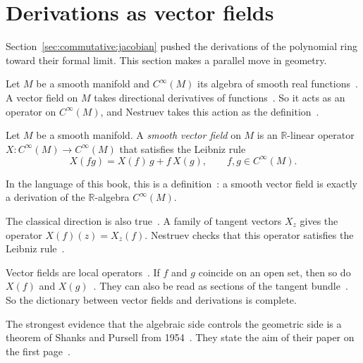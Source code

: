 \section{Derivations as vector fields}\label{sec:commutative:vector-fields-geometry}

Section~\ref{sec:commutative:jacobian} pushed the derivations of the
polynomial ring toward their formal limit. This section makes a parallel move
in geometry.

Let $M$ be a smooth manifold and $C^\infty(M)$ its algebra of smooth real
functions~\cite[p.~122]{Nestruev2020}. A vector field on $M$ takes directional derivatives of
functions~\cite[p.~122]{Nestruev2020}. So it acts as an operator on
$C^\infty(M)$, and Nestruev takes this action as the
definition~\cite[p.~122]{Nestruev2020}.

\begin{definition}\label{def:comm:vf}
Let $M$ be a smooth manifold. A \emph{smooth vector field} on $M$ is an
$\mathbb{R}$-linear operator $X\colon C^\infty(M) \to C^\infty(M)$ that
satisfies the Leibniz rule
\[
X(fg) = X(f)\,g + f\,X(g), \qquad f, g \in C^\infty(M).
\]
\end{definition}

In the language of this book, this is a
definition~\cite[p.~122]{Nestruev2020}: a smooth vector field is exactly a
derivation of the $\mathbb{R}$-algebra $C^\infty(M)$.

The classical direction is also true~\cite[p.~122]{Nestruev2020}. A family of
tangent vectors $X_z$ gives the operator $X(f)(z) = X_z(f)$. Nestruev checks
that this operator satisfies the Leibniz rule~\cite[p.~122]{Nestruev2020}.

Vector fields are local operators~\cite[Section~9.40, p.~123]{Nestruev2020}.
If $f$ and $g$ coincide on an open set, then so do $X(f)$ and
$X(g)$~\cite[Section~9.40, p.~123]{Nestruev2020}. They can also be read as
sections of the tangent bundle~\cite[p.~123]{Nestruev2020}. So the dictionary
between vector fields and derivations is complete.

The strongest evidence that the algebraic side controls the geometric side is
a theorem of Shanks and Pursell from 1954~\cite[p.~468]{ShanksPursell1954}.
They state the aim of their paper on the first
page~\cite[p.~468]{ShanksPursell1954}.

